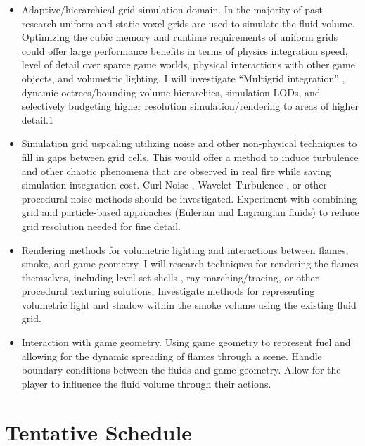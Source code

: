 \documentclass[a4paper, 11pt, titlepage]{article}
\begin{document}
\begin{itemize}
    \item Adaptive/hierarchical grid simulation domain. In the majority of past research
    uniform and static voxel grids are used to simulate the fluid volume.
    Optimizing the cubic memory and runtime requirements of uniform grids could offer
    large performance benefits in terms of physics integration speed,
    level of detail over sparce game worlds, physical interactions
    with other game objects, and volumetric lighting. I will investigate ``Multigrid
    integration'' \cite{DCGRID}, dynamic octrees/bounding volume hierarchies,
    simulation LODs, and selectively budgeting higher resolution simulation/rendering to areas of
    higher detail.1
    \item Simulation grid uspcaling utilizing noise and other non-physical techniques
    to fill in gaps between grid cells. This would offer a method to induce
    turbulence and other chaotic phenomena that are observed in real fire while
    saving simulation integration cost. Curl Noise \cite{curl}, Wavelet
    Turbulence \cite{wavelet}, or other procedural noise methods should be
    investigated. Experiment with combining grid and particle-based approaches
    (Eulerian and Lagrangian fluids) to reduce grid resolution needed for fine detail.
    \item Rendering methods for volumetric lighting and interactions between
    flames, smoke, and game geometry. I will research techniques for rendering the flames
    themselves, including level set shells \cite{nguyen}, ray
    marching/tracing, or other procedural texturing solutions. Investigate
    methods for representing volumetric light and shadow within the smoke
    volume using the existing fluid grid.
    \item Interaction with game geometry. Using game geometry to represent fuel
    and allowing for the dynamic spreading of flames through a scene. Handle
    boundary conditions between the fluids and game geometry. Allow for the
    player to influence the fluid volume through their actions.
\end{itemize}

\section{Tentative Schedule}
\end{document}
